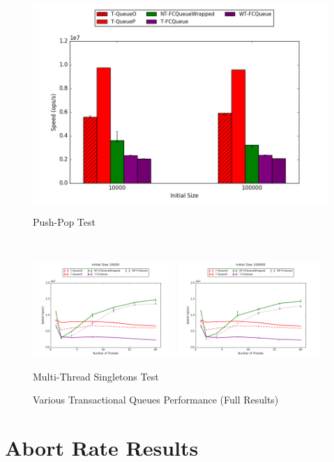 \begin{figure}[H]
    \centering
	\begin{minipage}{0.5\textwidth}
    \centering
    \includegraphics[width=\textwidth]{fcqueues/allQ:PushPop.png}
    \caption*{Push-Pop Test}
	\end{minipage}\\
    \begin{minipage}{\textwidth}
    \centering
    \includegraphics[width=0.48\textwidth]{fcqueues/allQ:RandSingleOps10000.png}
    \includegraphics[width=0.48\textwidth]{fcqueues/allQ:RandSingleOps100000.png}
    \caption*{Multi-Thread Singletons Test}
	\end{minipage}
    \caption{Various Transactional Queues Performance (Full Results)}
\end{figure}

\section{Abort Rate Results}
\label{app:queue_mt}

